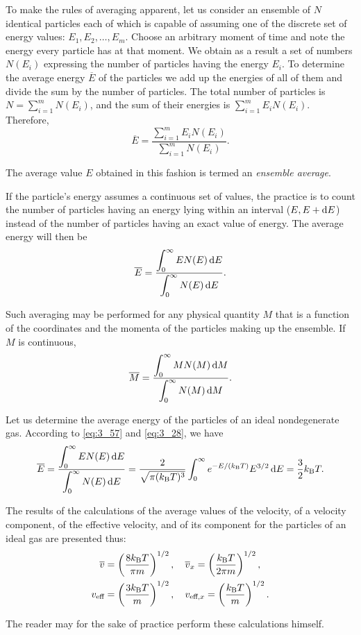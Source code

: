 To make the rules of averaging apparent, let us consider an ensemble of $N$ identical particles each of which is capable of assuming one of the discrete set of energy values: $E_1, E_2,\ldots, E_m$. Choose an arbitrary moment of time and note the energy every particle has at that moment. We obtain as a result a set of numbers $N(E_i)$ expressing the number of particles having the energy $E_i$. To determine the average energy $\overline{E}$ of the particles we add up the energies of all of them and divide the sum by the number of particles. The total number of particles is $N=\sum_{i=1}^m N(E_i)$, and the sum of their energies is $\sum_{i=1}^m E_i N(E_i)$. Therefore,
\begin{equation}\label{eq:3_56}
    \overline{E} = \frac{\displaystyle\sum_{i=1}^m E_i N(E_i)}{\displaystyle\sum_{i=1}^m N(E_i)}.
\end{equation}

\noindent
The average value $E$ obtained in this fashion is termed an \textit{ensemble average}.

If the particle's energy assumes a continuous set of values, the practice is to count the number of particles having an energy lying within an interval ($E, E+\mathrm{d} E$) instead of the number of particles having an exact value of energy. The average energy will then be
\begin{equation}\label{eq:3_57}
    \overline{E} = \frac{\displaystyle\int_0^{\infty} E N(E)\, \mathrm{d} E}{\displaystyle\int_0^{\infty} N(E)\, \mathrm{d} E}.
\end{equation}

Such averaging may be performed for any physical quantity $M$ that is a function of the coordinates and the momenta of the particles making up the ensemble. If $M$ is continuous,
\begin{equation}\label{eq:3_58}
    \overline{M} = \frac{\displaystyle\int_0^{\infty} M N(M)\, \mathrm{d} M}{\displaystyle\int_0^{\infty} N(M)\, \mathrm{d} M}.
\end{equation}

Let us determine the average energy of the particles of an ideal nondegenerate gas. According to \eqref{eq:3_57} and \eqref{eq:3_28}, we have
\begin{equation}\label{eq:3_59}
    \overline{E} = \frac{\displaystyle\int_0^{\infty} E N(E)\, \mathrm{d} E}{\displaystyle\int_0^{\infty} N(E)\, \mathrm{d} E} = \frac{2}{\sqrt{\pi(k_{\text{B}}T)^3}} \int_0^{\infty} e^{-E/(k_{\text{B}}T)} E^{3/2}\, \mathrm{d} E = \frac{3}{2}k_{\text{B}}T.
\end{equation}

The results of the calculations  of the average values of the velocity, of a velocity component, of the effective velocity, and of its component for the particles of an ideal gas are presented thus:
\begin{align*}
    \overline{v} &= \left(\frac{8k_{\text{B}}T}{\pi m}\right)^{1/2},\quad \overline{v}_x = \left(\frac{k_{\text{B}}T}{2\pi m}\right)^{1/2},\\
    v_{\text{eff}} &= \left(\frac{3k_{\text{B}}T}{m}\right)^{1/2},\quad v_{\text{eff,$x$}} = \left(\frac{k_{\text{B}}T}{m}\right)^{1/2}.
\end{align*}

The reader may for the sake of practice perform these calculations himself.
